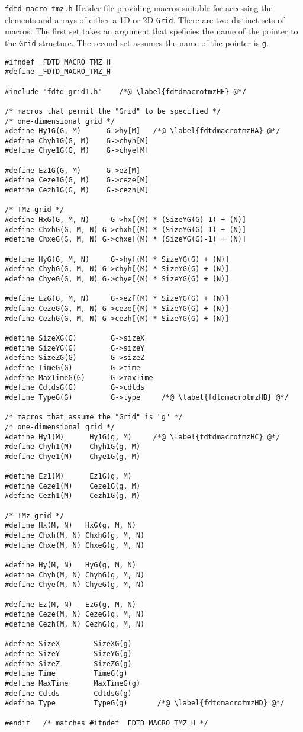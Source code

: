 \begin{program}
{\tt fdtd-macro-tmz.h} Header file providing macros suitable for
accessing the elements and arrays of either a 1D or 2D {\tt Grid}.
There are two distinct sets of macros.  The first set takes an
argument that speficies the name of the pointer to the {\tt Grid}
structure.  The second set assumes the name of the pointer is {\tt g}.
\label{pro:fdtdmacrotmzh}
\codemiddle
\begin{lstlisting}
#ifndef _FDTD_MACRO_TMZ_H
#define _FDTD_MACRO_TMZ_H

#include "fdtd-grid1.h"    /*@ \label{fdtdmacrotmzHE} @*/

/* macros that permit the "Grid" to be specified */
/* one-dimensional grid */
#define Hy1G(G, M)      G->hy[M]   /*@ \label{fdtdmacrotmzHA} @*/
#define Chyh1G(G, M)    G->chyh[M]
#define Chye1G(G, M)    G->chye[M]

#define Ez1G(G, M)      G->ez[M]
#define Ceze1G(G, M)    G->ceze[M]
#define Cezh1G(G, M)    G->cezh[M]

/* TMz grid */
#define HxG(G, M, N)     G->hx[(M) * (SizeYG(G)-1) + (N)]
#define ChxhG(G, M, N) G->chxh[(M) * (SizeYG(G)-1) + (N)]
#define ChxeG(G, M, N) G->chxe[(M) * (SizeYG(G)-1) + (N)]

#define HyG(G, M, N)     G->hy[(M) * SizeYG(G) + (N)]
#define ChyhG(G, M, N) G->chyh[(M) * SizeYG(G) + (N)]
#define ChyeG(G, M, N) G->chye[(M) * SizeYG(G) + (N)]

#define EzG(G, M, N)     G->ez[(M) * SizeYG(G) + (N)]
#define CezeG(G, M, N) G->ceze[(M) * SizeYG(G) + (N)]
#define CezhG(G, M, N) G->cezh[(M) * SizeYG(G) + (N)]

#define SizeXG(G)        G->sizeX
#define SizeYG(G)        G->sizeY
#define SizeZG(G)        G->sizeZ
#define TimeG(G)         G->time
#define MaxTimeG(G)      G->maxTime
#define CdtdsG(G)        G->cdtds
#define TypeG(G)         G->type     /*@ \label{fdtdmacrotmzHB} @*/

/* macros that assume the "Grid" is "g" */
/* one-dimensional grid */
#define Hy1(M)      Hy1G(g, M)     /*@ \label{fdtdmacrotmzHC} @*/
#define Chyh1(M)    Chyh1G(g, M)
#define Chye1(M)    Chye1G(g, M)

#define Ez1(M)      Ez1G(g, M)
#define Ceze1(M)    Ceze1G(g, M)
#define Cezh1(M)    Cezh1G(g, M)

/* TMz grid */
#define Hx(M, N)   HxG(g, M, N)
#define Chxh(M, N) ChxhG(g, M, N)
#define Chxe(M, N) ChxeG(g, M, N) 

#define Hy(M, N)   HyG(g, M, N)
#define Chyh(M, N) ChyhG(g, M, N)
#define Chye(M, N) ChyeG(g, M, N)

#define Ez(M, N)   EzG(g, M, N)
#define Ceze(M, N) CezeG(g, M, N) 
#define Cezh(M, N) CezhG(g, M, N) 

#define SizeX        SizeXG(g)
#define SizeY        SizeYG(g)
#define SizeZ        SizeZG(g)
#define Time         TimeG(g)
#define MaxTime      MaxTimeG(g)
#define Cdtds        CdtdsG(g)
#define Type         TypeG(g)       /*@ \label{fdtdmacrotmzHD} @*/

#endif   /* matches #ifndef _FDTD_MACRO_TMZ_H */
\end{lstlisting}
\end{program}

